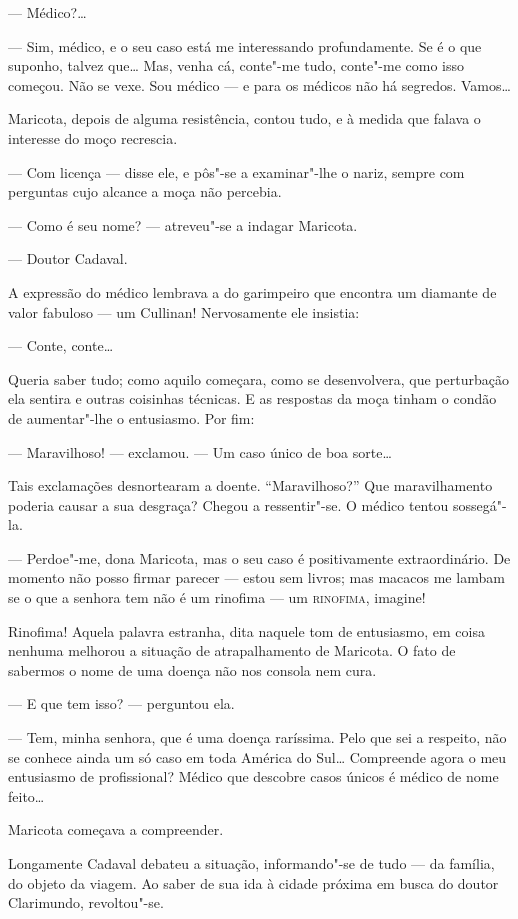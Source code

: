 --- Médico?\ldots{}

--- Sim, médico, e o seu caso está me interessando profundamente. Se é o
que suponho, talvez que\ldots{} Mas, venha cá, conte"-me tudo, conte"-me como
isso começou. Não se vexe. Sou médico --- e para os médicos não há
segredos. Vamos\ldots{}

Maricota, depois de alguma resistência, contou tudo, e à medida que
falava o interesse do moço recrescia.

--- Com licença --- disse ele, e pôs"-se a examinar"-lhe o nariz, sempre
com perguntas cujo alcance a moça não percebia.

--- Como é seu nome? --- atreveu"-se a indagar Maricota.

--- Doutor Cadaval.

A expressão do médico lembrava a do garimpeiro que encontra um diamante
de valor fabuloso --- um Cullinan! Nervosamente ele insistia:

--- Conte, conte\ldots{}

Queria saber tudo; como aquilo começara, como se desenvolvera, que
perturbação ela sentira e outras coisinhas técnicas. E as respostas da
moça tinham o condão de aumentar"-lhe o entusiasmo. Por fim:

--- Maravilhoso! --- exclamou. --- Um caso único de boa sorte\ldots{}

Tais exclamações desnortearam a doente. ``Maravilhoso?'' Que
maravilhamento poderia causar a sua desgraça? Chegou a ressentir"-se. O
médico tentou sossegá"-la.

--- Perdoe"-me, dona Maricota, mas o seu caso é positivamente
extraordinário. De momento não posso firmar parecer --- estou sem
livros; mas macacos me lambam se o que a senhora tem não é um rinofima
--- um \textsc{rinofima}, imagine!

Rinofima! Aquela palavra estranha, dita naquele tom de entusiasmo, em
coisa nenhuma melhorou a situação de atrapalhamento de Maricota. O fato
de sabermos o nome de uma doença não nos consola nem cura.

--- E que tem isso? --- perguntou ela.

--- Tem, minha senhora, que é uma doença raríssima. Pelo que sei a
respeito, não se conhece ainda um só caso em toda América do Sul\ldots{}
Compreende agora o meu entusiasmo de profissional? Médico que descobre
casos únicos é médico de nome feito\ldots{}

Maricota começava a compreender.

Longamente Cadaval debateu a situação, informando"-se de tudo --- da
família, do objeto da viagem. Ao saber de sua ida à cidade próxima em
busca do doutor Clarimundo, revoltou"-se.

